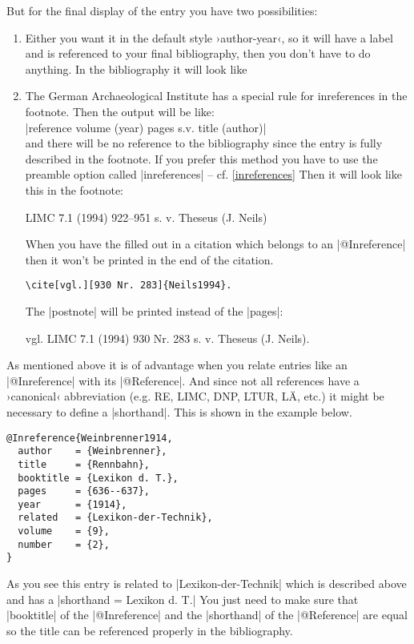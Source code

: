 \documentclass[a4paper,
10pt,
greek,
french,
spanish,
italian,
ngerman,
english
]{ltxdoc}
\begin{document}
But for the final display of the entry  you have two possibilities:
 \begin{enumerate}
\item\label{inreference:a} 

Either you want it in the default style ›author-year‹, so it will have a label and is referenced to your final bibliography, then you don’t have to do anything.
In the bibliography it will look like

\item\label{inreference:b} 
The German Archaeological Institute has a special rule for inreferences in the footnote.
Then the output will be like:\\
|reference volume (year) pages s.v. title (author)| \\
and there will be no reference to the bibliography since the entry is fully described in the footnote.
 If you prefer this method you have to use the preamble option called  |inreferences| -- cf. \cref{inreferences}
Then it will look like this in the footnote:
\begin{bsp}
LIMC 7.1 (1994) 922--951 s. v. Theseus (J. Neils)
\end{bsp}
When you have the  filled out in a citation which belongs to an |@Inreference| then it won’t be printed in the end of the citation.
\begin{lstlisting}
\cite[vgl.][930 Nr. 283]{Neils1994}.
\end{lstlisting}
The |postnote|  will be printed instead of the |pages|:
 \begin{bsp}
vgl. LIMC 7.1 (1994) 930 Nr. 283 s. v. Theseus (J. Neils).
 \end{bsp}
 
\end{enumerate}

As mentioned above it is of advantage when you relate entries like  an |@Inreference| with its |@Reference|. 
And since not all references have a ›canonical‹ abbreviation (e.g. RE, LIMC, DNP, LTUR, LÄ, etc.) it might be necessary to define a |shorthand|.
This is shown in the example below.
 
\begin{lstlisting}[style=bibentry,label=Weinbrenner1914,caption={{@}Inreference\{Weinbrenner1914,…\} }]
@Inreference{Weinbrenner1914,
  author    = {Weinbrenner},
  title     = {Rennbahn},
  booktitle = {Lexikon d. T.},
  pages     = {636--637},
  year      = {1914},
  related   = {Lexikon-der-Technik},
  volume    = {9},
  number    = {2},
}
\end{lstlisting}
As you see this entry is related to |Lexikon-der-Technik| which is described above and has a |shorthand = {Lexikon d. T.}|
You just need to make sure that  |booktitle| of the |@Inreference| and the |shorthand| of the  |@Reference| are equal so the title can be referenced properly in the bibliography.
\end{document}
